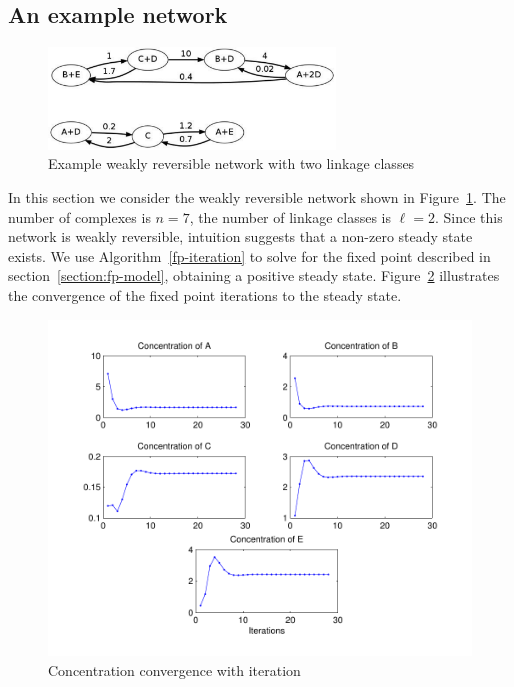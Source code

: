 \documentclass[smallextended]{svjour3}       %
\newcommand*{\0}{\mathbf{0}}
\newcommand*{\1}{\mathbf{1}}
\begin{document}
\subsection{An example network}
\label{example-network}

\begin{figure}%
   \centering
   \includegraphics[width=3in]{paperNetwork}
   \caption{Example weakly reversible network with two linkage classes}
   \label{fig:network-small}
\end{figure}

In this section we consider the weakly reversible network shown in
Figure~\ref{fig:network-small}.  The number of complexes is $n = 7$, the number of
linkage classes is $\ell = 2$.
Since this network is weakly reversible, intuition suggests that a
non-zero steady state exists.  We use Algorithm~\ref{fp-iteration} to solve for
the fixed point described in section~\ref{section:fp-model}, obtaining a
positive steady state.  Figure~\ref{fig:ConcentrationVsIteration} illustrates
the convergence of the fixed point iterations to the steady state.

\begin{figure}%
   \sidecaption
   \includegraphics[width=4.5in]{ConcentrationVsIterationExample}
   \caption{Concentration convergence with iteration}
   \label{fig:ConcentrationVsIteration}
\end{figure}
\end{document}
